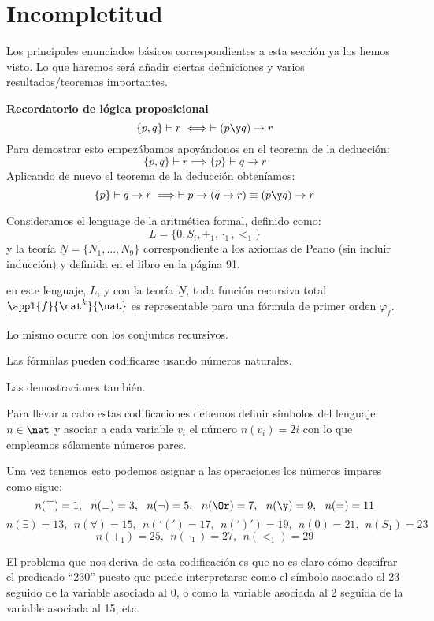 \section{Incompletitud}

Los principales enunciados básicos correspondientes a esta sección ya los hemos visto. Lo que haremos será añadir ciertas definiciones y varios resultados/teoremas importantes.

\textbf{Recordatorio de lógica proposicional}
\[\{p,q\}\vdash r \iff \vdash (p\y q) \to r\]
Para demostrar esto empezábamos apoyándonos en el teorema de la deducción:
\[\{p,q\} \vdash r \implies \{p\} \vdash q \to r\]
Aplicando de nuevo el teorema de la deducción obteníamos:
\[\{p\} \vdash q \to r \implies \vdash p \to (q \to r) \equiv (p \y q ) \to r\]

\begin{theorem}
Consideramos el lenguage de la aritmética formal, definido como:
\[L=\{0,S_i,+_1,\cdot_1, <_1\}\]
y la teoría $\underline{N}=\{N_1,...,N_9\}$ correspondiente a los axiomas de Peano (sin incluir inducción) y definida en el libro en la página 91.

en este lenguaje, $L$, y con la teoría $\underline{N}$, toda función recursiva total $\appl{f}{\nat^k}{\nat}$ es representable para una fórmula de primer orden $\varphi_f$.

Lo mismo ocurre con los conjuntos recursivos.
\end{theorem}

\begin{prop}[Codificación]
Las fórmulas pueden codificarse usando números naturales.

Las demostraciones también.

\end{prop}

Para llevar a cabo estas codificaciones debemos definir símbolos del lenguaje $n \in \nat$ y asociar a cada variable $v_i$ el número $n(v_i)=2i$ con lo que empleamos sólamente números pares.

Una vez tenemos esto podemos asignar a las operaciones los números impares como sigue:
\[n(\top) = 1, \ \ n(\perp)=3, \ \ n(\neg) = 5, \ \ n(\Or) = 7, \ \ n(\y)=9, \ \ n(=)=11\]
\[n(\exists)=13, \ \ n(\forall) =15, \ \ n('(')=17, \ \ n(')')=19, \ \ n(0)=21, \ \ n(S_1)=23\]
\[n(+_1)=25, \ \ n(\cdot_1)=27, \ \ n(<_1) = 29\]

El problema que nos deriva de esta codificación es que no es claro cómo descifrar el predicado ``230'' puesto que puede interpretarse como el símbolo asociado al 23 seguido de la variable asociada al 0, o como la variable asociada al 2 seguida de la variable asociada al 15, etc.


